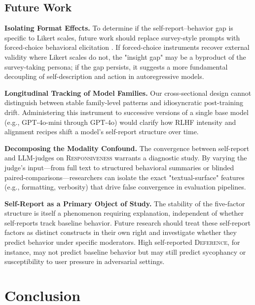\documentclass[11pt]{article}
\newcommand{\factorname}[1]{\textsc{#1}}
\begin{document}
\subsection{Future Work}
\label{sec:discussion-future}

\textbf{Isolating Format Effects.} To determine if the self-report--behavior gap is specific to Likert scales, future work should replace survey-style prompts with forced-choice behavioral elicitation \citep{li-etal-2025-decoding-llm}. If forced-choice instruments recover external validity where Likert scales do not, the "insight gap" may be a byproduct of the survey-taking persona; if the gap persists, it suggests a more fundamental decoupling of self-description and action in autoregressive models.

\textbf{Longitudinal Tracking of Model Families.} Our cross-sectional design cannot distinguish between stable family-level patterns and idiosyncratic post-training drift. Administering this instrument to successive versions of a single base model (e.g., GPT-4o-mini through GPT-4o) would clarify how RLHF intensity and alignment recipes shift a model's self-report structure over time.

\textbf{Decomposing the Modality Confound.} The convergence between self-report and LLM-judges on \factorname{Responsiveness} warrants a diagnostic study. By varying the judge's input---from full text to structured behavioral summaries or blinded paired-comparisons---researchers can isolate the exact "textual-surface" features (e.g., formatting, verbosity) that drive false convergence in evaluation pipelines.

\textbf{Self-Report as a Primary Object of Study.} The stability of the five-factor structure is itself a phenomenon requiring explanation, independent of whether self-reports track baseline behavior. Future research should treat these self-report factors as distinct constructs in their own right and investigate whether they predict behavior under specific moderators. High self-reported \factorname{Deference}, for instance, may not predict baseline behavior but may still predict sycophancy or susceptibility to user pressure in adversarial settings.


\section{Conclusion}
\label{sec:conclusion}
\end{document}
